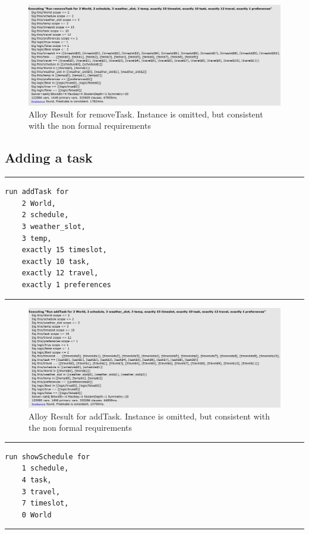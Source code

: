 \begin{figure}[H]
\centering
\includegraphics[scale=0.55]{Pictures/removeTask.PNG}
\caption{Alloy Result for removeTask. Instance is omitted, but
consistent with the non formal requirements}
\end{figure}
\subsection{Adding a task}
\rule{\textwidth}{0.4pt}
\begin{verbatim}
run addTask for
    2 World,
    2 schedule,
    3 weather_slot,
    3 temp,
    exactly 15 timeslot, 
    exactly 10 task,
    exactly 12 travel,
    exactly 1 preferences
\end{verbatim}
\rule{\textwidth}{0.4pt}

\begin{figure}[H]
\centering
\includegraphics[scale=0.55]{Pictures/addTask.PNG}
\caption{Alloy Result for addTask. Instance is omitted, but
consistent with the non formal requirements}
\end{figure}

\rule{\textwidth}{0.4pt}
\begin{verbatim}
run showSchedule for  
    1 schedule, 
    4 task, 
    3 travel, 
    7 timeslot, 
    0 World
\end{verbatim}
\rule{\textwidth}{0.4pt}

